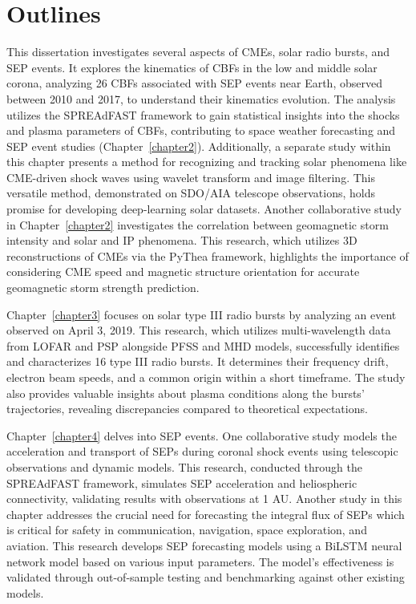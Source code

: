 \section{Outlines}
This dissertation investigates several aspects of CMEs, solar radio bursts, and SEP events. It explores the kinematics of CBFs in the low and middle solar corona, analyzing 26 CBFs associated with SEP events near Earth, observed between 2010 and 2017, to understand their kinematics evolution. The analysis utilizes the SPREAdFAST framework to gain statistical insights into the shocks and plasma parameters of CBFs, contributing to space weather forecasting and SEP event studies (Chapter~\ref{chapter2}). Additionally, a separate study within this chapter presents a method for recognizing and tracking solar phenomena like CME-driven shock waves using wavelet transform and image filtering. This versatile method, demonstrated on SDO/AIA telescope observations, holds promise for developing deep-learning solar datasets. Another collaborative study in Chapter~\ref{chapter2} investigates the correlation between geomagnetic storm intensity and solar and IP phenomena. This research, which utilizes 3D reconstructions of CMEs via the PyThea framework, highlights the importance of considering CME speed and magnetic structure orientation for accurate geomagnetic storm strength prediction.

Chapter~\ref{chapter3} focuses on solar type III radio bursts by analyzing an event observed on April 3, 2019. This research, which utilizes multi-wavelength data from LOFAR and PSP alongside PFSS and MHD models, successfully identifies and characterizes 16 type III radio bursts. It determines their frequency drift, electron beam speeds, and a common origin within a short timeframe. The study also provides valuable insights about plasma conditions along the bursts' trajectories, revealing discrepancies compared to theoretical expectations.

Chapter~\ref{chapter4} delves into SEP events. One collaborative study models the acceleration and transport of SEPs during coronal shock events using telescopic observations and dynamic models. This research, conducted through the SPREAdFAST framework, simulates SEP acceleration and heliospheric connectivity, validating results with observations at 1 AU. Another study in this chapter addresses the crucial need for forecasting the integral flux of SEPs which is critical for safety in communication, navigation, space exploration, and aviation. This research develops SEP forecasting models using a BiLSTM neural network model based on various input parameters. The model's effectiveness is validated through out-of-sample testing and benchmarking against other existing models.

